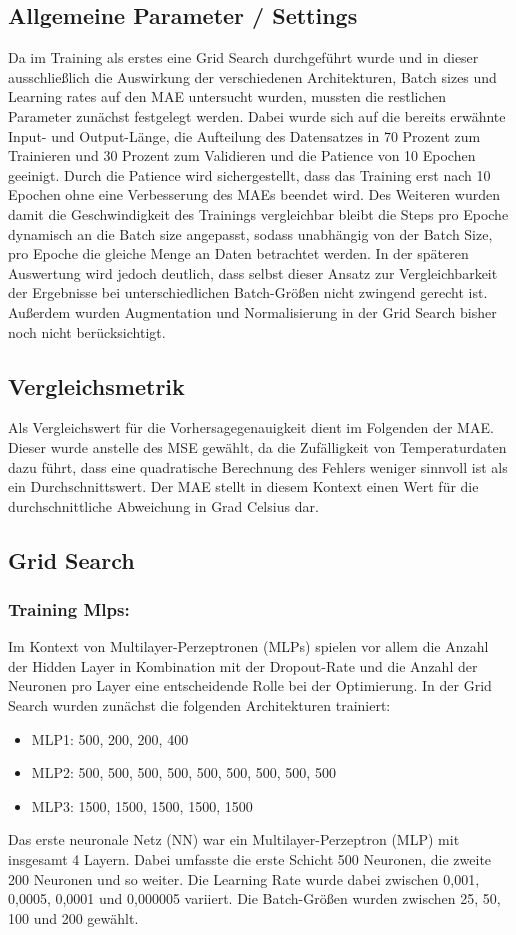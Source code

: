 \documentclass[acmtog, authorversion]{acmart} %
\begin{document}
\subsection{Allgemeine Parameter / Settings}

Da im Training als erstes eine Grid Search durchgeführt wurde und in dieser ausschließlich die Auswirkung der verschiedenen Architekturen, Batch sizes und Learning rates auf den MAE untersucht wurden, mussten die restlichen Parameter zunächst festgelegt werden. Dabei wurde sich auf die bereits erwähnte Input- und Output-Länge, die Aufteilung des Datensatzes in 70 Prozent zum Trainieren und 30 Prozent zum Validieren und die Patience von 10 Epochen geeinigt. Durch die Patience wird sichergestellt, dass das Training erst nach 10 Epochen ohne eine Verbesserung des MAEs beendet wird. Des Weiteren wurden damit die Geschwindigkeit des Trainings vergleichbar bleibt die Steps pro Epoche dynamisch an die Batch size angepasst, sodass unabhängig von der Batch Size, pro Epoche die gleiche Menge an Daten betrachtet werden. In der späteren Auswertung wird jedoch deutlich, dass selbst dieser Ansatz zur Vergleichbarkeit der Ergebnisse bei unterschiedlichen Batch-Größen nicht zwingend gerecht ist. Außerdem wurden Augmentation und Normalisierung in der Grid Search bisher noch nicht berücksichtigt.

\subsection{Vergleichsmetrik}
Als Vergleichswert für die Vorhersagegenauigkeit dient im Folgenden der MAE. Dieser wurde anstelle des MSE gewählt, da die Zufälligkeit von Temperaturdaten dazu führt, dass eine quadratische Berechnung des Fehlers weniger sinnvoll ist als ein Durchschnittswert. Der MAE stellt in diesem Kontext einen Wert für die durchschnittliche Abweichung in Grad Celsius dar.

\subsection{Grid Search}
\subsubsection{Training Mlps: }
Im Kontext von Multilayer-Perzeptronen (MLPs) spielen vor allem die Anzahl der Hidden Layer in Kombination mit der Dropout-Rate und die Anzahl der Neuronen pro Layer eine entscheidende Rolle bei der Optimierung. In der Grid Search wurden zunächst die folgenden Architekturen trainiert:
\begin{itemize}
    \item MLP1: 500, 200, 200, 400
    \item MLP2: 500, 500, 500, 500, 500, 500, 500, 500, 500
    \item MLP3: 1500, 1500, 1500, 1500, 1500
\end{itemize}
Das erste neuronale Netz (NN) war ein Multilayer-Perzeptron (MLP) mit insgesamt 4 Layern. Dabei umfasste die erste Schicht 500 Neuronen, die zweite 200 Neuronen und so weiter. Die Learning Rate wurde dabei zwischen 0,001, 0,0005, 0,0001 und 0,000005 variiert. Die Batch-Größen wurden zwischen 25, 50, 100 und 200 gewählt.
\end{document}
